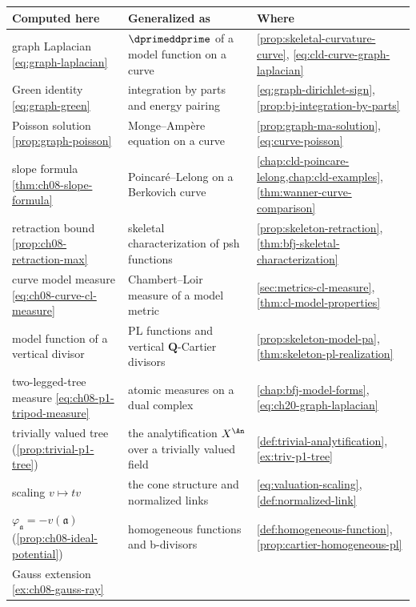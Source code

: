 \begin{center}
\small
\begin{tabular}{p{}|p{}|p{}}
\textbf{Computed here}&\textbf{Generalized as}&\textbf{Where}\\ \hline
graph Laplacian \eqref{eq:graph-laplacian}
  &$\dprimeddprime$ of a model function on a curve
  &\cref{prop:skeletal-curvature-curve},
   \eqref{eq:cld-curve-graph-laplacian}\\
Green identity \eqref{eq:graph-green}
  &integration by parts and energy pairing
  &\eqref{eq:graph-dirichlet-sign},
   \cref{prop:bj-integration-by-parts}\\
Poisson solution \cref{prop:graph-poisson}
  &Monge--Amp\`ere equation on a curve
  &\cref{prop:graph-ma-solution},
   \eqref{eq:curve-poisson}\\
slope formula \cref{thm:ch08-slope-formula}
  &Poincar\'e--Lelong on a Berkovich curve
  &\cref{chap:cld-poincare-lelong,chap:cld-examples},
   \cref{thm:wanner-curve-comparison}\\
retraction bound \cref{prop:ch08-retraction-max}
  &skeletal characterization of psh functions
  &\cref{prop:skeleton-retraction},
   \cref{thm:bfj-skeletal-characterization}\\
curve model measure \eqref{eq:ch08-curve-cl-measure}
  &Chambert--Loir measure of a model metric
  &\cref{sec:metrics-cl-measure},
   \cref{thm:cl-model-properties}\\
model function of a vertical divisor
  &PL functions and vertical $\mathbf Q$-Cartier divisors
  &\cref{prop:skeleton-model-pa},
   \cref{thm:skeleton-pl-realization}\\
two-legged-tree measure \eqref{eq:ch08-p1-tripod-measure}
  &atomic measures on a dual complex
  &\cref{chap:bfj-model-forms},
   \eqref{eq:ch20-graph-laplacian}\\
trivially valued tree
   (\cref{prop:trivial-p1-tree})
  &the analytification $X^{\An}$ over a trivially valued field
  &\cref{def:trivial-analytification},
   \cref{ex:triv-p1-tree}\\
scaling $v\mapsto tv$
  &the cone structure and normalized links
  &\eqref{eq:valuation-scaling},
   \cref{def:normalized-link}\\
$\varphi_{\mathfrak a}=-v(\mathfrak a)$
   (\cref{prop:ch08-ideal-potential})
  &homogeneous functions and b-divisors
  &\cref{def:homogeneous-function},
   \cref{prop:cartier-homogeneous-pl}\\
Gauss extension \cref{ex:ch08-gauss-ray}

\end{tabular}
\end{center}

